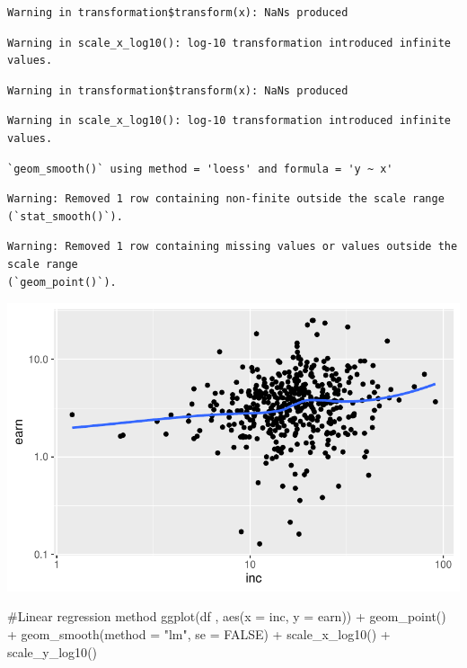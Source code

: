 \documentclass[
  letterpaper,
  DIV=11,
  numbers=noendperiod]{scrartcl}
\newenvironment{Shaded}{\begin{snugshade}}{\end{snugshade}}
\newcommand{\AttributeTok}[1]{\textcolor[rgb]{0.40,0.45,0.13}{#1}}
\newcommand{\CommentTok}[1]{\textcolor[rgb]{0.37,0.37,0.37}{#1}}
\newcommand{\ConstantTok}[1]{\textcolor[rgb]{0.56,0.35,0.01}{#1}}
\newcommand{\FunctionTok}[1]{\textcolor[rgb]{0.28,0.35,0.67}{#1}}
\newcommand{\NormalTok}[1]{\textcolor[rgb]{0.00,0.23,0.31}{#1}}
\newcommand{\SpecialCharTok}[1]{\textcolor[rgb]{0.37,0.37,0.37}{#1}}
\newcommand{\StringTok}[1]{\textcolor[rgb]{0.13,0.47,0.30}{#1}}
\begin{document}
\begin{verbatim}
Warning in transformation$transform(x): NaNs produced
\end{verbatim}

\begin{verbatim}
Warning in scale_x_log10(): log-10 transformation introduced infinite values.
\end{verbatim}

\begin{verbatim}
Warning in transformation$transform(x): NaNs produced
\end{verbatim}

\begin{verbatim}
Warning in scale_x_log10(): log-10 transformation introduced infinite values.
\end{verbatim}

\begin{verbatim}
`geom_smooth()` using method = 'loess' and formula = 'y ~ x'
\end{verbatim}

\begin{verbatim}
Warning: Removed 1 row containing non-finite outside the scale range
(`stat_smooth()`).
\end{verbatim}

\begin{verbatim}
Warning: Removed 1 row containing missing values or values outside the scale range
(`geom_point()`).
\end{verbatim}

\includegraphics{Ch4.Describing-Variables_files/figure-pdf/unnamed-chunk-5-1.pdf}

\begin{Shaded}
\begin{Highlighting}[]
\CommentTok{\#Linear regression method}
\FunctionTok{ggplot}\NormalTok{(df , }\FunctionTok{aes}\NormalTok{(}\AttributeTok{x =}\NormalTok{ inc, }\AttributeTok{y =}\NormalTok{ earn)) }\SpecialCharTok{+}
  \FunctionTok{geom\_point}\NormalTok{() }\SpecialCharTok{+}
  \FunctionTok{geom\_smooth}\NormalTok{(}\AttributeTok{method =} \StringTok{"lm"}\NormalTok{, }\AttributeTok{se =} \ConstantTok{FALSE}\NormalTok{) }\SpecialCharTok{+}
  \FunctionTok{scale\_x\_log10}\NormalTok{() }\SpecialCharTok{+}
  \FunctionTok{scale\_y\_log10}\NormalTok{()}
\end{Highlighting}
\end{Shaded}
\end{document}
